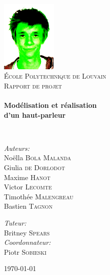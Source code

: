 \begin{titlepage}
\begin{center}

\includegraphics[width=0.2\textwidth]{img/max_vert}~\\[1cm]

\textsc{\LARGE École Polytechnique de Louvain}\\[1.5cm]

\textsc{\Large Rapport de projet}\\[0.5cm]

\HRule \\[0.4cm]
{ \huge \bfseries Modélisation et réalisation \\ d’un haut-parleur \\[0.4cm] }

\HRule \\[1.5cm]

\begin{minipage}{0.45\textwidth}
\begin{flushleft} \large
\emph{Auteurs:}\\
\quad Noëlla \textsc{Bola Malanda}\\
\quad Giulia \textsc{de Dorlodot}\\
\quad Maxime \textsc{Hanot}\\
\quad Victor \textsc{Lecomte}\\
\quad Timothée \textsc{Malengreau}\\
\quad Bastien \textsc{Tagnon}
\end{flushleft}
\end{minipage}
\qquad \qquad
\begin{minipage}{0.3\textwidth}
\begin{flushleft} \large
\emph{Tuteur:} \\
\quad Britney \textsc{Spears}\\
\emph{Coordonnateur:}\\
\quad Piotr \textsc{Sobieski}\\
\vspace{3\baselineskip}
\end{flushleft}
\end{minipage}

\vfill

{\large \today}

\end{center}
\end{titlepage}
